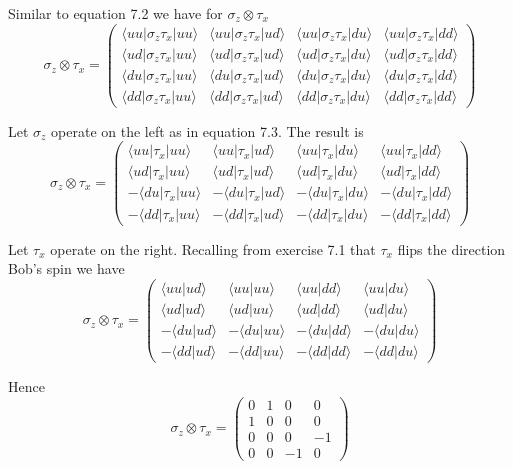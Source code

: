 


\bigskip
Similar to equation 7.2 we have for $\sigma_z\otimes\tau_x$
\begin{equation*}
\sigma_z\otimes\tau_x=\begin{pmatrix}
\langle uu|\sigma_z\tau_x|uu\rangle
&\langle uu|\sigma_z\tau_x|ud\rangle
&\langle uu|\sigma_z\tau_x|du\rangle
&\langle uu|\sigma_z\tau_x|dd\rangle
\\[1ex]
\langle ud|\sigma_z\tau_x|uu\rangle
&\langle ud|\sigma_z\tau_x|ud\rangle
&\langle ud|\sigma_z\tau_x|du\rangle
&\langle ud|\sigma_z\tau_x|dd\rangle
\\[1ex]
\langle du|\sigma_z\tau_x|uu\rangle
&\langle du|\sigma_z\tau_x|ud\rangle
&\langle du|\sigma_z\tau_x|du\rangle
&\langle du|\sigma_z\tau_x|dd\rangle
\\[1ex]
\langle dd|\sigma_z\tau_x|uu\rangle
&\langle dd|\sigma_z\tau_x|ud\rangle
&\langle dd|\sigma_z\tau_x|du\rangle
&\langle dd|\sigma_z\tau_x|dd\rangle
\end{pmatrix}
\end{equation*}

Let $\sigma_z$ operate on the left as in equation 7.3.
The result is
\begin{equation*}
\sigma_z\otimes\tau_x=\begin{pmatrix}
\langle uu|\tau_x|uu\rangle
&\langle uu|\tau_x|ud\rangle
&\langle uu|\tau_x|du\rangle
&\langle uu|\tau_x|dd\rangle
\\[1ex]
\langle ud|\tau_x|uu\rangle
&\langle ud|\tau_x|ud\rangle
&\langle ud|\tau_x|du\rangle
&\langle ud|\tau_x|dd\rangle
\\[1ex]
-\langle du|\tau_x|uu\rangle
&-\langle du|\tau_x|ud\rangle
&-\langle du|\tau_x|du\rangle
&-\langle du|\tau_x|dd\rangle
\\[1ex]
-\langle dd|\tau_x|uu\rangle
&-\langle dd|\tau_x|ud\rangle
&-\langle dd|\tau_x|du\rangle
&-\langle dd|\tau_x|dd\rangle
\end{pmatrix}
\end{equation*}

Let $\tau_x$ operate on the right.
Recalling from exercise 7.1 that $\tau_x$ flips the direction Bob's spin we have
\begin{equation*}
\sigma_z\otimes\tau_x=\begin{pmatrix}
\langle uu|ud\rangle
&\langle uu|uu\rangle
&\langle uu|dd\rangle
&\langle uu|du\rangle
\\[1ex]
\langle ud|ud\rangle
&\langle ud|uu\rangle
&\langle ud|dd\rangle
&\langle ud|du\rangle
\\[1ex]
-\langle du|ud\rangle
&-\langle du|uu\rangle
&-\langle du|dd\rangle
&-\langle du|du\rangle
\\[1ex]
-\langle dd|ud\rangle
&-\langle dd|uu\rangle
&-\langle dd|dd\rangle
&-\langle dd|du\rangle
\end{pmatrix}
\end{equation*}

Hence
\begin{equation*}
\sigma_z\otimes\tau_x=\begin{pmatrix}
0&1&0&0
\\
1&0&0&0
\\
0&0&0&-1
\\
0&0&-1&0
\end{pmatrix}
\end{equation*}


